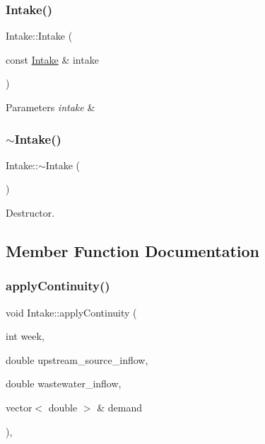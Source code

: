 \mbox{\label{classIntake_aa81e2e35940482717fa67c33b6acd002}} 
\subsubsection{\texorpdfstring{Intake()}{Intake()}\hspace{0.1cm}{\footnotesize\ttfamily [3/3]}}
{\footnotesize\ttfamily Intake\+::\+Intake (\begin{DoxyParamCaption}\item[{const \mbox{\hyperlink{classIntake}{Intake}} \&}]{intake }\end{DoxyParamCaption})}


\begin{DoxyParams}{Parameters}
{\em intake} & \\
\hline
\end{DoxyParams}
\mbox{\label{classIntake_abf57ff6edf55f292921fb7838059ad26}} 
\subsubsection{\texorpdfstring{$\sim$\+Intake()}{~Intake()}}
{\footnotesize\ttfamily Intake\+::$\sim$\+Intake (\begin{DoxyParamCaption}{ }\end{DoxyParamCaption})\hspace{0.3cm}{\ttfamily [override]}}

Destructor. 

\subsection{Member Function Documentation}
\mbox{\label{classIntake_acd5ab74c4091b286e69ecdcc495d83ce}} 
\subsubsection{\texorpdfstring{apply\+Continuity()}{applyContinuity()}}
{\footnotesize\ttfamily void Intake\+::apply\+Continuity (\begin{DoxyParamCaption}\item[{int}]{week,  }\item[{double}]{upstream\+\_\+source\+\_\+inflow,  }\item[{double}]{wastewater\+\_\+inflow,  }\item[{vector$<$ double $>$ \&}]{demand }\end{DoxyParamCaption})\hspace{0.3cm}{\ttfamily [override]}, {\ttfamily [virtual]}}

